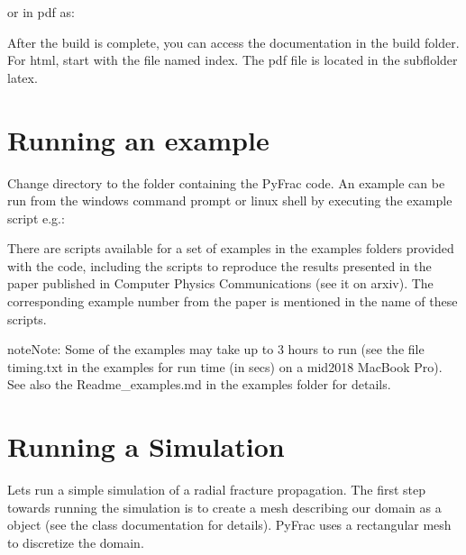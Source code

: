 \documentclass[letterpaper,10pt,english]{sphinxmanual}
\begin{document}
\begin{sphinxVerbatim}[commandchars=\\\{\}]
 
\end{sphinxVerbatim}

\sphinxAtStartPar
or in pdf as:

\begin{sphinxVerbatim}[commandchars=\\\{\}]
 
\end{sphinxVerbatim}

\sphinxAtStartPar
After the build is complete, you can access the documentation in the build folder. For html, start with the file named index. The pdf file is located in the subflolder latex.


\section{Running an example}
\label{\detokenize{GettingStarted:running-an-example}}
\sphinxAtStartPar
Change directory to the folder containing the PyFrac code. An example can be run from the windows command prompt or linux shell by executing the example script e.g.:

\begin{sphinxVerbatim}[commandchars=\\\{\}]
 
\end{sphinxVerbatim}

\sphinxAtStartPar
There are scripts available for a set of examples in the examples folders provided with the code, including the scripts to reproduce the results presented in the paper published in Computer Physics Communications (see it on arxiv). The corresponding example number from the paper is mentioned in the name of these scripts.

\begin{sphinxadmonition}{note}{Note:}
\sphinxAtStartPar
Some of the examples may take up to 3 hours to run (see the file timing.txt in the examples for run time (in secs) on a mid\sphinxhyphen{}2018 MacBook Pro). See also the Readme\_examples.md in the examples folder for details.
\end{sphinxadmonition}

\sphinxstepscope


\section{Running a Simulation}
\label{\detokenize{RunningASimulation:running-a-simulation}}\label{\detokenize{RunningASimulation:run-a-simulation}}\label{\detokenize{RunningASimulation::doc}}
\sphinxAtStartPar
Lets run a simple simulation of a radial fracture propagation. The first step towards running the simulation is to create a mesh describing our domain as a  object (see the class documentation for details). PyFrac uses a rectangular mesh to discretize the domain.
\end{document}
